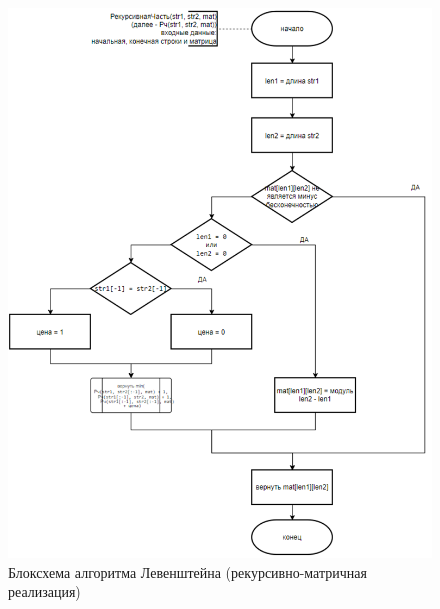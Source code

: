 \begin{figure}[H]
    \centering
    \includegraphics[width=1.05\textwidth]{img/block_1_3_1.png}
    \caption{Блоксхема алгоритма Левенштейна (рекурсивно-матричная реализация)}
\end{figure}

